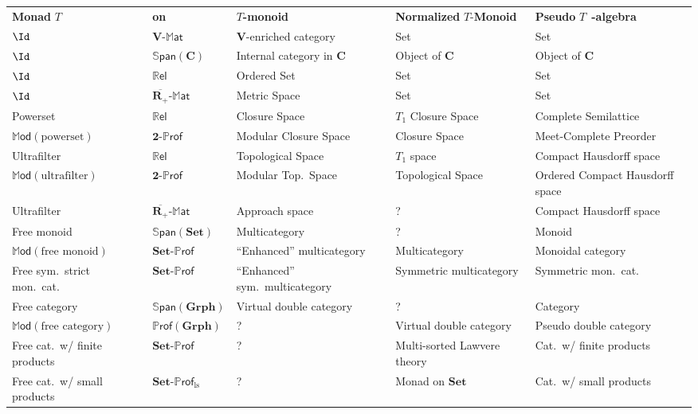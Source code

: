 \documentclass{tac}
\newcommand{\V}{\ensuremath{\mathbf{V}}}
\newcommand{\C}{\ensuremath{\mathbf{C}}}
\newcommand{\mb}[1]{{\mathbf{#1}}}
\newcommand{\eR}{\ensuremath{\overline{\mathbf{R}_+}}}
\newcommand{\MAT}[1]{\mathbf{#1}\mbox{-}\mathbb{M}\mathsf{at}}
\newcommand{\PROF}[1]{\mathbf{#1}\mbox{-}\mathbb{P}\mathsf{rof}}
\newcommand{\SPAN}[1]{\mathbb{S}\mathsf{pan}\!\left(\mb{#1}\right)}
\newcommand{\iPROF}[1]{\mathbb{P}\mathsf{rof}(\mb{#1})}
\newcommand{\MOD}{\mathbb{M}\mathsf{od}}
\newcommand{\Rel}{\mathbb{R}\mathsf{el}}
\numberwithin{equation}{section}
\begin{document}
\begin{table}
  \centering
  \small
\noindent\begin{tabular}{p{3cm}p{2.5cm}p{3cm}p{3cm}p{3cm}}

\textbf{Monad} $T$ & \textbf{on} & $T$\textbf{-monoid} & \textbf{Normalized} \mbox{$T$-\textbf{Monoid}} & \textbf{Pseudo} \mbox{$T$ \textbf{-algebra}} \\
\rowcolor[gray]{0.8} $\Id$ & $\MAT{V}$ & \V-enriched \mbox{category} & Set & Set \\
$\Id$ & $\SPAN{C}$ & Internal category in \C & Object of \C\ & Object of \C\ \\
\rowcolor[gray]{0.8}$\Id$ & $\Rel$ & Ordered Set & Set & Set \\
$\Id$ & $\MAT{\eR}$ & Metric Space & Set & Set \\
\rowcolor[gray]{0.8}Powerset & $\Rel$ & Closure Space & $T_1$ Closure Space & Complete \mbox{Semilattice} \\
$\MOD(\text{powerset})$ & $\PROF{2}$ & Modular Closure Space  & Closure Space & Meet-Complete Preorder \\
\rowcolor[gray]{0.8}Ultrafilter & $\Rel$ & Topological Space & $T_1$ space & Compact \mbox{Hausdorff} space \\
$\MOD(\text{ultrafilter})$ & $\PROF{2}$ & \raggedright Modular Top.\ Space & Topological Space & Ordered Compact Hausdorff space \\
\rowcolor[gray]{0.8}Ultrafilter & $\MAT{\eR}$ & Approach space & ? & Compact \mbox{Hausdorff} space \\
Free monoid & $\SPAN{Set}$ & Multicategory & ? & Monoid \\
\rowcolor[gray]{0.8}$\MOD(\text{free monoid})$ & $\PROF{Set}$ & ``Enhanced'' multi\-category & Multicategory & Monoidal \mbox{category} \\
Free sym.\ strict mon.\ cat. & $\PROF{Set}$ & ``Enhanced'' sym.\ multicategory & Symmetric \mbox{multicategory} & Symmetric mon.\ cat. \\
\rowcolor[gray]{0.8}Free category & $\SPAN{Grph}$ & \raggedright Virtual double category & ? & Category \\
$\MOD(\text{free category})$ & $\iPROF{Grph}$ & ? & \raggedright Virtual double category & Pseudo double category \\
\rowcolor[gray]{0.8}\raggedright Free cat.\ w/ finite products & $\PROF{Set}$ & ? & Multi-sorted Lawvere theory & Cat.\ w/ finite products \\
\raggedright Free cat.\ w/ small products & $\PROF{Set}_{\mathrm{ls}}$ & ? & Monad on $\mb{Set}$ & Cat.\ w/ small products \\

\end{tabular}
\end{table}
\end{document}
